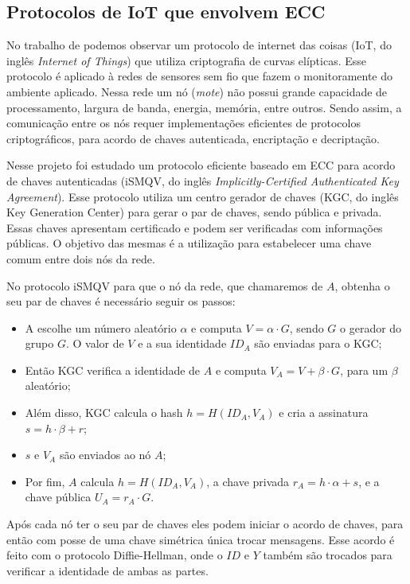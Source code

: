 \subsection{Protocolos de IoT que envolvem ECC}

No trabalho de \cite{SimplicioJr2016} podemos observar um protocolo de internet das coisas (IoT, do inglês \emph{Internet of Things}) que utiliza criptografia de curvas elípticas. Esse protocolo é aplicado à redes de sensores sem fio que fazem o monitoramente do ambiente aplicado. Nessa rede um nó (\emph{mote}) não possui grande capacidade de processamento, largura de banda, energia, memória, entre outros. Sendo assim, a comunicação entre os nós requer implementações eficientes de protocolos criptográficos, para acordo de chaves autenticada, encriptação e decriptação.

Nesse projeto foi estudado um protocolo eficiente baseado em ECC para acordo de chaves autenticadas (iSMQV, do inglês \emph{Implicitly-Certified Authenticated Key Agreement}). Esse protocolo utiliza um centro gerador de chaves (KGC, do inglês Key Generation Center) para gerar o par de chaves, sendo pública e privada. Essas chaves apresentam certificado e podem ser verificadas com informações públicas. O objetivo das mesmas é a utilização para estabelecer uma chave comum entre dois nós da rede.

No protocolo iSMQV para que o nó da rede, que chamaremos de $A$, obtenha o seu par de chaves é necessário seguir os passos:
\begin{itemize}
    \item A escolhe um número aleatório $\alpha$ e computa $V = \alpha \cdot G$, sendo $G$ o gerador do grupo $G$. O valor de $V$ e a sua identidade $ID_A$ são enviadas para o KGC;
    \item Então KGC verifica a identidade de $A$ e computa $V_A = V + \beta \cdot G$, para um $\beta$ aleatório;
    \item Além disso, KGC calcula o hash $h = H(ID_A, V_A)$ e cria a assinatura $s = h \cdot \beta + r$;
    \item $s$ e $V_A$ são enviados ao nó $A$;
    \item Por fim, $A$ calcula $h = H(ID_A, V_A)$, a chave privada $r_A = h \cdot \alpha + s$, e a chave pública $U_A = r_A \cdot G$.
\end{itemize}

Após cada nó ter o seu par de chaves eles podem iniciar o acordo de chaves, para então com posse de uma chave simétrica única trocar mensagens. Esse acordo é feito com o protocolo Diffie-Hellman, onde o $ID$ e $Y$ também são trocados para verificar a identidade de ambas as partes. 

